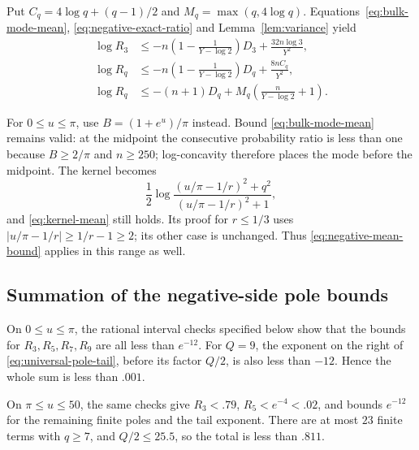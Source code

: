 Put $C_q=4\log q+(q-1)/2$ and $M_q=\max(q,4\log q)$.
Equations~\eqref{eq:bulk-mode-mean}, \eqref{eq:negative-exact-ratio}
and Lemma~\ref{lem:variance} yield
\begin{align}
 \log R_3&\le-n\left(1-\frac1{Y-\log2}\right)D_3
                    +\frac{32n\log3}{Y^2},\label{eq:negative-three-bound}\\
 \log R_q&\le-n\left(1-\frac1{Y-\log2}\right)D_q
                    +\frac{8nC_q}{Y^2},\label{eq:negative-var-bound}\\
 \log R_q&\le-(n+1)D_q+M_q\left(\frac n{Y-\log2}+1\right).
                    \label{eq:negative-mean-bound}
\end{align}

For $0\le u\le\pi$, use $B=(1+e^u)/\pi$ instead. Bound
\eqref{eq:bulk-mode-mean} remains valid: at the midpoint the
consecutive probability ratio is less than one because
$B\ge2/\pi$ and $n\ge250$; log-concavity therefore places the mode
before the midpoint. The kernel becomes
\[
 \frac12\log\frac{(u/\pi-1/r)^2+q^2}{(u/\pi-1/r)^2+1},
\]
and \eqref{eq:kernel-mean} still holds. Its proof for $r\le1/3$ uses
$|u/\pi-1/r|\ge1/r-1\ge2$; its other case is unchanged.
Thus \eqref{eq:negative-mean-bound} applies in this range as well.

\subsection{Summation of the negative-side pole bounds}

On $0\le u\le\pi$, the rational interval checks specified below
show that the bounds for $R_3,R_5,R_7,R_9$ are all less than $e^{-12}$.
For $Q=9$, the exponent on the right of
\eqref{eq:universal-pole-tail}, before its factor $Q/2$, is also less
than $-12$. Hence the whole sum is less than $.001$.

On $\pi\le u\le50$, the same checks give
$R_3<.79$, $R_5<e^{-4}<.02$, and bounds $e^{-12}$ for the remaining
finite poles and the tail exponent. There are at most $23$ finite
terms with $q\ge7$, and $Q/2\le25.5$, so the total is less than $.811$.

